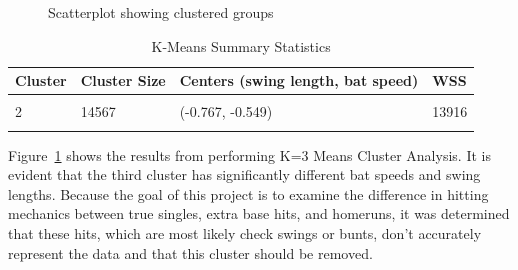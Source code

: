 \documentclass[
  letterpaper,
  DIV=11,
  numbers=noendperiod]{scrartcl}
\begin{document}
\begin{figure}[H]


\caption{\label{fig-cluster}Scatterplot showing clustered groups}

\end{figure}%

\begin{table}[!h]
\centering
\caption{\label{tab:unnamed-chunk-20}K-Means Summary Statistics}
\centering
\begin{tabular}[t]{llll}
\toprule
Cluster & Cluster Size & Centers (swing length, bat speed) & WSS\\
\midrule
\cellcolor{gray!10}{1} & \cellcolor{gray!10}{21986} & \cellcolor{gray!10}{(0.559, 0.429)} & \cellcolor{gray!10}{15027}\\
2 & 14567 & (-0.767, -0.549) & 13916\\
\cellcolor{gray!10}{3} & \cellcolor{gray!10}{162} & \cellcolor{gray!10}{(-6.891, -8.857)} & \cellcolor{gray!10}{236}\\
\bottomrule
\end{tabular}
\end{table}

Figure~\ref{fig-cluster} shows the results from performing K=3 Means
Cluster Analysis. It is evident that the third cluster has significantly
different bat speeds and swing lengths. Because the goal of this project
is to examine the difference in hitting mechanics between true singles,
extra base hits, and homeruns, it was determined that these hits, which
are most likely check swings or bunts, don't accurately represent the
data and that this cluster should be removed.
\end{document}
